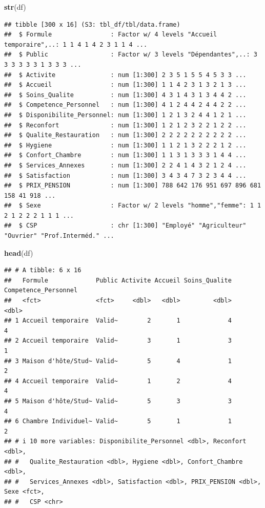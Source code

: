 \documentclass[
]{article}
\newenvironment{Shaded}{\begin{snugshade}}{\end{snugshade}}
\newcommand{\FunctionTok}[1]{\textcolor[rgb]{0.13,0.29,0.53}{\textbf{#1}}}
\newcommand{\NormalTok}[1]{#1}
\begin{document}
\begin{Shaded}
\begin{Highlighting}[]
\FunctionTok{str}\NormalTok{(df)}
\end{Highlighting}
\end{Shaded}

\begin{verbatim}
## tibble [300 x 16] (S3: tbl_df/tbl/data.frame)
##  $ Formule                : Factor w/ 4 levels "Accueil temporaire",..: 1 1 4 1 4 2 3 1 1 4 ...
##  $ Public                 : Factor w/ 3 levels "Dépendantes",..: 3 3 3 3 3 3 1 3 3 3 ...
##  $ Activite               : num [1:300] 2 3 5 1 5 5 4 5 3 3 ...
##  $ Accueil                : num [1:300] 1 1 4 2 3 1 3 2 1 3 ...
##  $ Soins_Qualite          : num [1:300] 4 3 1 4 3 1 3 4 4 2 ...
##  $ Competence_Personnel   : num [1:300] 4 1 2 4 4 2 4 4 2 2 ...
##  $ Disponibilite_Personnel: num [1:300] 1 2 1 3 2 4 4 1 2 1 ...
##  $ Reconfort              : num [1:300] 1 2 1 2 3 2 2 1 2 2 ...
##  $ Qualite_Restauration   : num [1:300] 2 2 2 2 2 2 2 2 2 2 ...
##  $ Hygiene                : num [1:300] 1 1 2 1 3 2 2 2 1 2 ...
##  $ Confort_Chambre        : num [1:300] 1 1 3 1 3 3 3 1 4 4 ...
##  $ Services_Annexes       : num [1:300] 2 2 4 1 4 3 2 1 2 4 ...
##  $ Satisfaction           : num [1:300] 3 4 3 4 7 3 2 3 4 4 ...
##  $ PRIX_PENSION           : num [1:300] 788 642 176 951 697 896 681 158 41 918 ...
##  $ Sexe                   : Factor w/ 2 levels "homme","femme": 1 1 2 1 2 2 2 1 1 1 ...
##  $ CSP                    : chr [1:300] "Employé" "Agriculteur" "Ouvrier" "Prof.Interméd." ...
\end{verbatim}

\begin{Shaded}
\begin{Highlighting}[]
\FunctionTok{head}\NormalTok{(df)}
\end{Highlighting}
\end{Shaded}

\begin{verbatim}
## # A tibble: 6 x 16
##   Formule             Public Activite Accueil Soins_Qualite Competence_Personnel
##   <fct>               <fct>     <dbl>   <dbl>         <dbl>                <dbl>
## 1 Accueil temporaire  Valid~        2       1             4                    4
## 2 Accueil temporaire  Valid~        3       1             3                    1
## 3 Maison d'hôte/Stud~ Valid~        5       4             1                    2
## 4 Accueil temporaire  Valid~        1       2             4                    4
## 5 Maison d'hôte/Stud~ Valid~        5       3             3                    4
## 6 Chambre Individuel~ Valid~        5       1             1                    2
## # i 10 more variables: Disponibilite_Personnel <dbl>, Reconfort <dbl>,
## #   Qualite_Restauration <dbl>, Hygiene <dbl>, Confort_Chambre <dbl>,
## #   Services_Annexes <dbl>, Satisfaction <dbl>, PRIX_PENSION <dbl>, Sexe <fct>,
## #   CSP <chr>
\end{verbatim}
\end{document}
